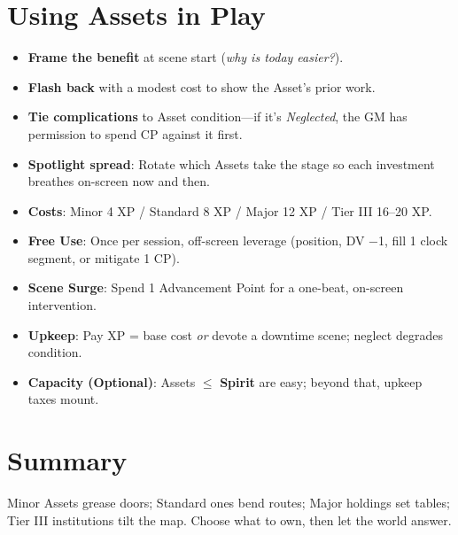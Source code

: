 \section{Using Assets in Play}
\begin{itemize}
  \item \textbf{Frame the benefit} at scene start (\emph{why is today easier?}).
  \item \textbf{Flash back} with a modest cost to show the Asset’s prior work.
  \item \textbf{Tie complications} to Asset condition—if it’s \emph{Neglected}, the GM has permission to spend CP against it first.
  \item \textbf{Spotlight spread}: Rotate which Assets take the stage so each investment breathes on-screen now and then.
\end{itemize}

\begin{tcolorbox}[colback=blue!5!white,colframe=blue!75!black,title=Asset Quick Reference,fonttitle=\bfseries]
\begin{itemize}
  \item \textbf{Costs}: Minor 4 XP / Standard 8 XP / Major 12 XP / Tier III 16–20 XP.
  \item \textbf{Free Use}: Once per session, off-screen leverage (position, DV −1, fill 1 clock segment, or mitigate 1 CP).
  \item \textbf{Scene Surge}: Spend 1 Advancement Point for a one-beat, on-screen intervention.
  \item \textbf{Upkeep}: Pay XP = base cost \emph{or} devote a downtime scene; neglect degrades condition.
  \item \textbf{Capacity (Optional)}: Assets $\leq$ \textbf{Spirit} are easy; beyond that, upkeep taxes mount.
\end{itemize}
\end{tcolorbox}

\section{Summary}
Minor Assets grease doors; Standard ones bend routes; Major holdings set tables; Tier III institutions tilt the map. Choose what to own, then let the world answer.
